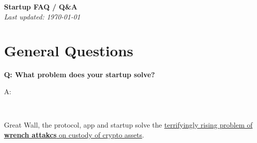 \documentclass[12pt,a4paper]{article}
\newenvironment{question}[1]{%
  \vspace{0.8em}\noindent\textbf{Q: #1}\par
  \vspace{0.2em}\noindent\begin{itshape}A:\end{itshape}~%
}{\vspace{0.8em}}
\begin{document}
\begin{center}
  {\LARGE \textbf{Startup FAQ / Q\&A}}\\[0.3em]
  \textit{Last updated: \today}
\end{center}

\section{General Questions}

\begin{question}{What problem does your startup solve?}
Great Wall, the protocol, app and startup solve the \href{https://x.com/search?q=jameson\%20lopp\%20wrench\%20attack&src=typed_query&f=live}{terrifyingly rising problem of \textbf{wrench attakcs} on custody of crypto assets}.
\end{question}
\end{document}

